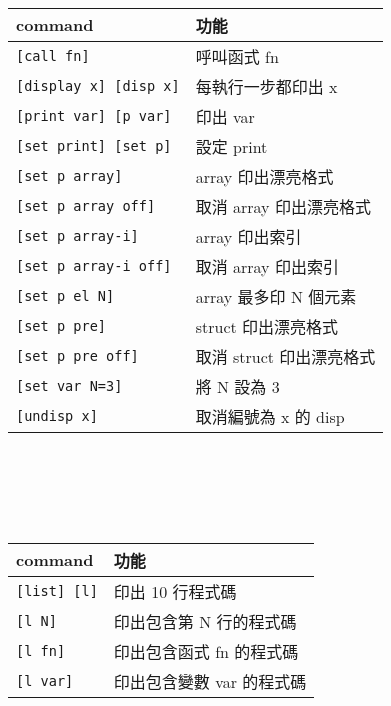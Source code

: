 \begin{center}
     \\
    \begin{tabular}{|p{2.7cm}|p{2.7cm}|}
        \hline
        command                         & 功能 \\
        \hline
        \verb|[call fn]|                & 呼叫函式 fn \\
        \verb|[display x] [disp x]|     & 每執行一步都印出 x \\
        \verb|[print var] [p var]|      & 印出 var \\
        \verb|[set print] [set p]|      & 設定 print \\
        \verb|[set p array]|            & array 印出漂亮格式 \\
        \verb|[set p array off]|        & 取消 array 印出漂亮格式 \\
        \verb|[set p array-i]|          & array 印出索引 \\
        \verb|[set p array-i off]|      & 取消 array 印出索引 \\
        \verb|[set p el N]|             & array 最多印 N 個元素 \\
        \verb|[set p pre]|              & struct 印出漂亮格式 \\
        \verb|[set p pre off]|          & 取消 struct 印出漂亮格式 \\
        \verb|[set var N=3]|            & 將 N 設為 3 \\
        \verb|[undisp x]|               & 取消編號為 x 的 disp \\
        \hline
    \end{tabular} \\
    \hspace{\fill} \\
    \hspace{\fill} \\

     \\
    \begin{tabular}{|p{2.7cm}|p{2.7cm}|}
        \hline
        command                         & 功能 \\
        \hline
        \verb|[list] [l]|               & 印出 10 行程式碼  \\
        \verb|[l N]|                    & 印出包含第 N 行的程式碼  \\
        \verb|[l fn]|                   & 印出包含函式 fn 的程式碼 \\
        \verb|[l var]|                  & 印出包含變數 var 的程式碼 \\
        \hline
    \end{tabular} \\
    \hspace{\fill} \\
    \hspace{\fill} \\


\end{center}
